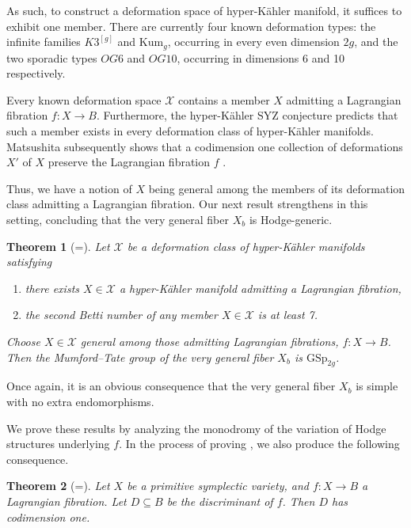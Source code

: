 \documentclass[12pt]{amsart}
\newtheorem{theorem}{Theorem}[section]
\theoremstyle{definition}
\numberwithin{equation}{section}
\begin{document}
As such, to construct a deformation space of hyper-K\"ahler manifold, it suffices 
to exhibit one member. There are currently four known deformation types: the infinite 
families \(K3^{[g]}\) and \(\mathrm{Kum}_g\), occurring in every even dimension \(2g\),
and the two sporadic types \(OG6\) and \(OG10\), occurring in dimensions 6 and 10 
respectively. 

Every known deformation space \(\mathcal{X}\) contains a member \(X\) admitting a 
Lagrangian fibration \(f: X \to B\). Furthermore, the hyper-K\"ahler SYZ conjecture 
predicts that such a member exists in every deformation class of hyper-K\"ahler 
manifolds. Matsushita subsequently shows that a codimension one collection of 
deformations \(X'\) of \(X\) preserve the Lagrangian fibration \(f\) \cite{matsushita16}.

Thus, we have a notion of \(X\) being general among the members of its deformation 
class admitting a Lagrangian fibration. Our next result strengthens 
 in this setting, concluding that the very general fiber 
\(X_b\) is Hodge-generic.

\begin{theorem}[=]
    Let \(\mathcal{X}\) be a deformation class of hyper-K\"ahler manifolds satisfying 
    \begin{enumerate}
        \item there exists \(X \in \mathcal{X}\) a hyper-K\"ahler manifold admitting a 
        Lagrangian fibration,
        \item the second Betti number of any member \(X \in \mathcal{X}\) is at least 7.
    \end{enumerate}
    Choose \(X \in \mathcal{X}\) general among those admitting Lagrangian fibrations,
    \(f: X \to B\). Then the Mumford--Tate group of the very general fiber \(X_b\) 
    is \(\mathrm{GSp}_{2g}\).
\end{theorem}

Once again, it is an obvious consequence that the very general fiber \(X_b\) is 
simple with no extra endomorphisms. 


We prove these results by analyzing the monodromy of the variation of Hodge structures 
underlying \(f\). In the process of proving , we also 
produce the following consequence.

\begin{theorem}[=]
    Let \(X\) be a primitive symplectic variety, and \(f: X \to B\) a Lagrangian 
    fibration. Let \(D \subseteq B\) be the discriminant of \(f\). Then \(D\) has 
    codimension one.
\end{theorem}
\end{document}
